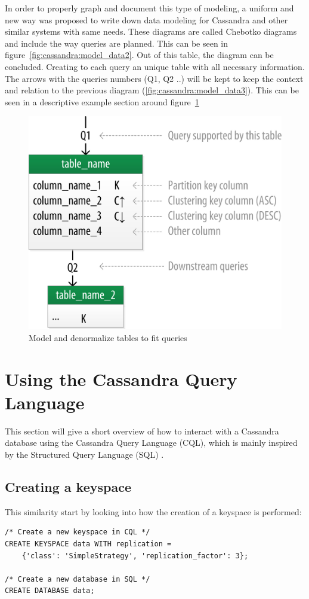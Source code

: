 In order to properly graph and document this type of modeling, a uniform and new way was proposed to write down data modeling for Cassandra and other similar systems with same needs. \autocite{chebotko2015data}
These diagrams are called Chebotko diagrams and include the way queries are planned. This can be seen in figure~\ref{fig:cassandra:model_data2}.
Out of this table, the diagram can be concluded. Creating to each query an unique table with all necessary information. The arrows with the queries numbers (Q1, Q2 ..) will be kept to keep the context and relation to the previous diagram (\ref{fig:cassandra:model_data3}).
This can be seen in a descriptive example section around figure~\ref{fig:cassandra:chebotko}

\begin{figure}[H]
    \centering
    \includegraphics[width=0.75\columnwidth]{img/model_example_primary_key.jpeg}
    \caption{Model and denormalize tables to fit queries \autocite{cassandra_oreilly}}
    \label{fig:cassandra:chebotko}
\end{figure}

\section{Using the Cassandra Query Language}  %
This section will give a short overview of how to interact with a Cassandra database using the Cassandra Query Language (CQL), which is mainly inspired by the Structured Query Language (SQL) \autocite{cqlAlexMeng, newInCQL3, cassandra3cqldocCreateKeystore}.

\subsection {Creating a keyspace}
This similarity start by looking into how the creation of a keyspace is performed:
\begin{verbatim}
/* Create a new keyspace in CQL */
CREATE KEYSPACE data WITH replication =
    {'class': 'SimpleStrategy', 'replication_factor': 3};

/* Create a new database in SQL */
CREATE DATABASE data;
\end{verbatim}


